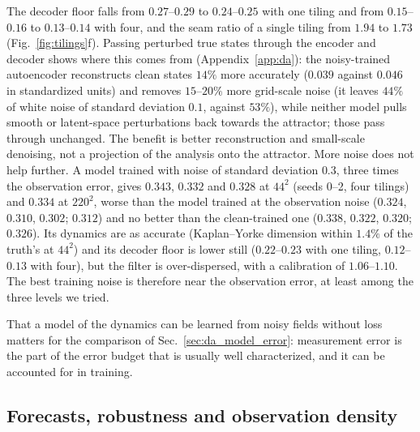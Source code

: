  The decoder floor falls from $0.27$--$0.29$ to $0.24$--$0.25$ with one tiling and
from $0.15$--$0.16$ to $0.13$--$0.14$ with four, and the seam ratio of a single
tiling from $1.94$ to $1.73$ (Fig.~\ref{fig:tilings}f). Passing perturbed true
states through the encoder and decoder shows where this comes from
(Appendix~\ref{app:da}): the noisy-trained autoencoder reconstructs clean
states $14\%$ more accurately ($0.039$ against $0.046$ in standardized units) and
removes $15$--$20\%$ more grid-scale noise (it leaves $44\%$ of white noise of
standard deviation $0.1$, against $53\%$), while neither model pulls smooth or
latent-space perturbations back towards the attractor; those pass through
unchanged. The benefit is better reconstruction and small-scale
denoising, not a projection of the analysis onto the attractor.
More noise does not help further. A model trained with noise of standard
deviation $0.3$, three times the observation error, gives $0.343$, $0.332$ and
$0.328$ at $44^2$ (seeds 0--2, four tilings) and $0.334$ at $220^2$, worse than the
model trained at the observation noise ($0.324$, $0.310$, $0.302$; $0.312$) and no
better than the clean-trained one ($0.338$, $0.322$, $0.320$; $0.326$). Its dynamics
are as accurate (Kaplan--Yorke dimension within $1.4\%$ of the truth's at $44^2$)
and its decoder floor is lower still ($0.22$--$0.23$ with one tiling,
$0.12$--$0.13$ with four), but the filter is over-dispersed, with a calibration
of $1.06$--$1.10$. The best training noise is therefore near the observation
error, at least among the three levels we tried.

That a model of the dynamics can be learned from noisy fields without
loss matters for the comparison of Sec.~\ref{sec:da_model_error}:
measurement error is the part of the error budget that is usually well
characterized, and it can be accounted for in training.

\subsection{Forecasts, robustness and observation density}
\label{sec:da_robust}

